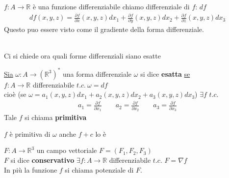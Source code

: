 \documentclass[a4paper, oneside]{article}
\begin{document}
\begin{proposition}
     $f:A \to \mathbb{R}$ è una funzione differenziabile  chiamo differenziale di $f$: $df$\\
    \begin{gather*}
        df(x,y,z)  = \frac{\partial f}{\partial x}(x,y,z) dx_1 + \frac{\partial f}{\partial y}(x,y,z) dx_2 + \frac{\partial f}{\partial z}(x,y,z) dx_3
    \end{gather*}
    Questo puo essere visto come il gradiente della forma differenziale.
\end{proposition}
\hfill\\


\noindent
Ci si chiede ora quali forme differenziali siano esatte 
\begin{definition}
    \underline{Sia} $\omega:A \to (\mathbb{R}^3)^*$ una forma differenziale $\omega$ si dice \textbf{esatta} \underline{se}\\
    $f:A \to \mathbb{R}$ differenziabile $t.c. \ \omega = df$\\
    cioè (se $\omega= a_1(x,y,z)dx_1+a_2(x,y,z)dx_2+a_3(x,y,z)dx_3$)  $\exists f$ $t.c.$
    \begin{gather*}
        a_1=\frac{\partial f}{\partial x_1} \qquad a_2=\frac{\partial f}{\partial x_2} \qquad a_3=\frac{\partial f}{\partial x_3}
    \end{gather*}
    Tale $f$ si chiama \textbf{primitiva}
\end{definition}

\begin{observation}
     $f$ è primitiva di $\omega$ anche $f+c$ lo è
\end{observation}

\begin{definition}
     $F:A \to \mathbb{R}^3$ un campo vettoriale $F=(F_1,F_2,F_3)$\\
    $F$ si dice \textbf{conservativo}  $\exists f:A \to \mathbb{R}$ differenziabile $t.c.$ $F=\nabla f$\\
    In più la funzione $f$ si chiama potenziale di $F$.
\end{definition}
\end{document}
